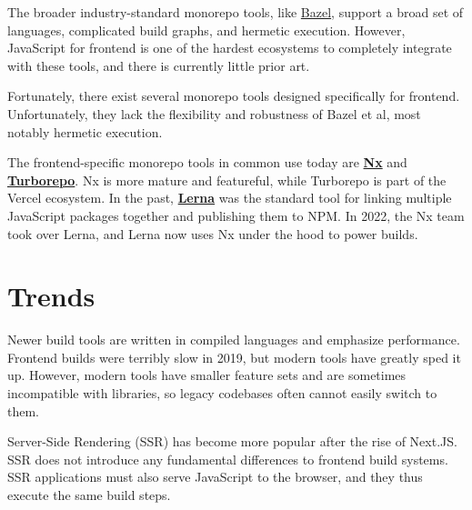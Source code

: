 \documentclass{article}
\begin{document}
The broader industry-standard monorepo tools, like  \href{https://bazel.build/}{Bazel}, support a
broad set of languages, complicated build graphs, and hermetic execution. However, JavaScript for
frontend is one of the hardest ecosystems to completely integrate with these tools, and there is
currently little prior art.

Fortunately, there exist several monorepo tools designed specifically for frontend. Unfortunately,
they lack the flexibility and robustness of Bazel et al, most notably hermetic execution.

The frontend-specific monorepo tools in common use today are \href{https://nx.dev/}{\textbf{Nx}} and
\href{https://turbo.build/repo}{\textbf{Turborepo}}. Nx is more mature and featureful, while
Turborepo is part of the Vercel ecosystem. In the past, \href{https://lerna.js.org/}{\textbf{Lerna}}
was the standard tool for linking multiple JavaScript packages together and publishing them to NPM.
In 2022, the Nx team took over Lerna, and Lerna now uses Nx under the hood to power builds.

\section{Trends}

Newer build tools are written in compiled languages and emphasize performance. Frontend builds were
terribly slow in 2019, but modern tools have greatly sped it up. However, modern tools have smaller
feature sets and are sometimes incompatible with libraries, so legacy codebases often cannot easily
switch to them.

Server-Side Rendering (SSR) has become more popular after the rise of Next.JS. SSR does not
introduce any fundamental differences to frontend build systems. SSR applications must also serve
JavaScript to the browser, and they thus execute the same build steps.
\end{document}
